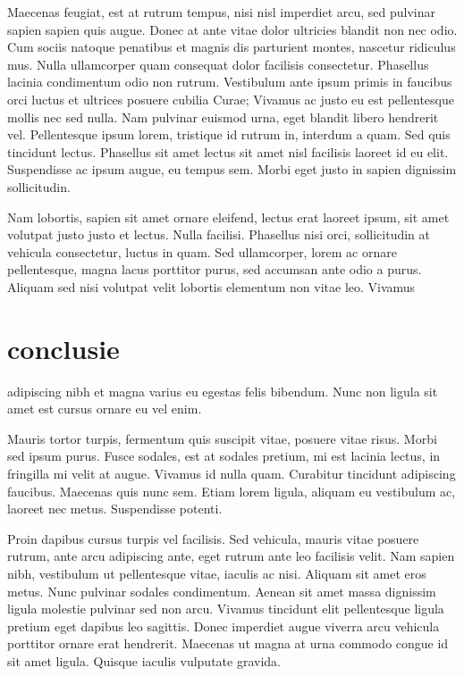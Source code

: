 \documentclass{article}
\begin{document}
Maecenas feugiat, est at rutrum tempus, nisi nisl imperdiet arcu, sed pulvinar
sapien sapien quis augue. Donec at ante vitae dolor ultricies blandit non nec
odio. Cum sociis natoque penatibus et magnis dis parturient montes, nascetur
ridiculus mus. Nulla ullamcorper quam consequat dolor facilisis consectetur.
Phasellus lacinia condimentum odio non rutrum. Vestibulum ante ipsum primis in
faucibus orci luctus et ultrices posuere cubilia Curae; Vivamus ac justo eu est
pellentesque mollis nec sed nulla. Nam pulvinar euismod urna, eget blandit
libero hendrerit vel. Pellentesque ipsum lorem, tristique id rutrum in, interdum
a quam. Sed quis tincidunt lectus. Phasellus sit amet lectus sit amet nisl
facilisis laoreet id eu elit. Suspendisse ac ipsum augue, eu tempus sem. Morbi
eget justo in sapien dignissim sollicitudin.

Nam lobortis, sapien sit amet ornare eleifend, lectus erat laoreet ipsum, sit
amet volutpat justo justo et lectus. Nulla facilisi. Phasellus nisi orci,
sollicitudin at vehicula consectetur, luctus in quam. Sed ullamcorper, lorem ac
ornare pellentesque, magna lacus porttitor purus, sed accumsan ante odio a
purus. Aliquam sed nisi volutpat velit lobortis elementum non vitae leo. Vivamus

\section{conclusie}
adipiscing nibh et magna varius eu egestas felis bibendum. Nunc non ligula sit
amet est cursus ornare eu vel enim.

Mauris tortor turpis, fermentum quis suscipit vitae, posuere vitae risus. Morbi
sed ipsum purus. Fusce sodales, est at sodales pretium, mi est lacinia lectus,
in fringilla mi velit at augue. Vivamus id nulla quam. Curabitur tincidunt
adipiscing faucibus. Maecenas quis nunc sem. Etiam lorem ligula, aliquam eu
vestibulum ac, laoreet nec metus. Suspendisse potenti.

Proin dapibus cursus turpis vel facilisis. Sed vehicula, mauris vitae posuere
rutrum, ante arcu adipiscing ante, eget rutrum ante leo facilisis velit. Nam
sapien nibh, vestibulum ut pellentesque vitae, iaculis ac nisi. Aliquam sit amet
eros metus. Nunc pulvinar sodales condimentum. Aenean sit amet massa dignissim
ligula molestie pulvinar sed non arcu. Vivamus tincidunt elit pellentesque
ligula pretium eget dapibus leo sagittis. Donec imperdiet augue viverra arcu
vehicula porttitor ornare erat hendrerit. Maecenas ut magna at urna commodo
congue id sit amet ligula. Quisque iaculis vulputate gravida. 
\end{document}
